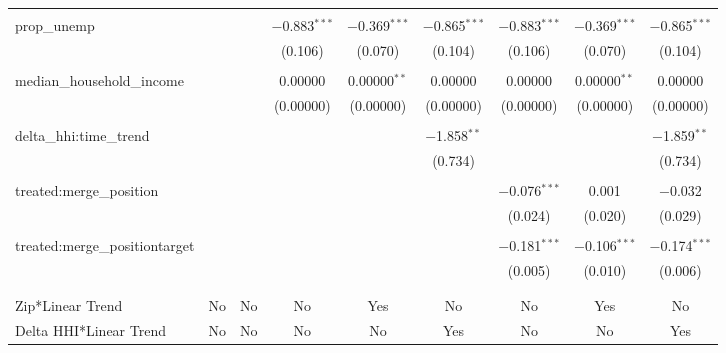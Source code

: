 \begin{table}[H]
{\begin{tabular}{@{\extracolsep{5pt}}lcccccccc}
   & & & & & & & & \\  

  prop\_unemp &  &  & $-$0.883$^{***}$ & $-$0.369$^{***}$ & $-$0.865$^{***}$ & $-$0.883$^{***}$ & $-$0.369$^{***}$ & $-$0.865$^{***}$ \\  

   &  &  & (0.106) & (0.070) & (0.104) & (0.106) & (0.070) & (0.104) \\  

   & & & & & & & & \\  

  median\_household\_income &  &  & 0.00000 & 0.00000$^{**}$ & 0.00000 & 0.00000 & 0.00000$^{**}$ & 0.00000 \\  

   &  &  & (0.00000) & (0.00000) & (0.00000) & (0.00000) & (0.00000) & (0.00000) \\  

   & & & & & & & & \\  

  delta\_hhi:time\_trend &  &  &  &  & $-$1.858$^{**}$ &  &  & $-$1.859$^{**}$ \\  

   &  &  &  &  & (0.734) &  &  & (0.734) \\  

   & & & & & & & & \\  

  treated:merge\_position &  &  &  &  &  & $-$0.076$^{***}$ & 0.001 & $-$0.032 \\  

   &  &  &  &  &  & (0.024) & (0.020) & (0.029) \\  

   & & & & & & & & \\  

  treated:merge\_positiontarget &  &  &  &  &  & $-$0.181$^{***}$ & $-$0.106$^{***}$ & $-$0.174$^{***}$ \\  

   &  &  &  &  &  & (0.005) & (0.010) & (0.006) \\  

   & & & & & & & & \\  

 \hline \\[-1.8ex]  

 Zip*Linear Trend & No & No & No & Yes & No & No & Yes & No \\  

 Delta HHI*Linear Trend & No & No & No & No & Yes & No & No & Yes \\  


\end{tabular}}
\end{table}
